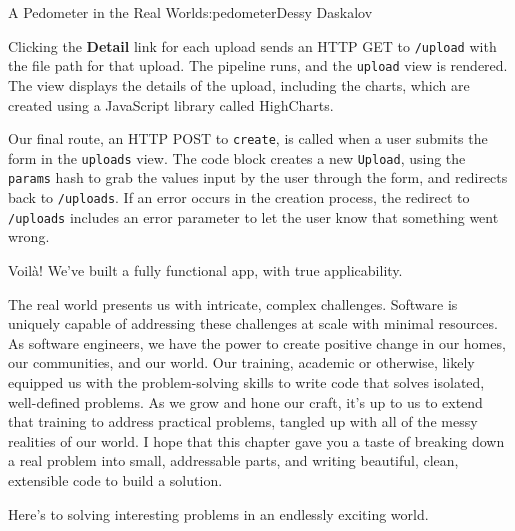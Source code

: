 \begin{aosachapter}{A Pedometer in the Real World}{s:pedometer}{Dessy Daskalov}
\label{get-upload}

Clicking the \textbf{Detail} link for each upload sends an HTTP GET to
\texttt{/upload} with the file path for that upload. The pipeline runs,
and the \texttt{upload} view is rendered. The view displays the details
of the upload, including the charts, which are created using a
JavaScript library called HighCharts.

\label{post-create}

Our final route, an HTTP POST to \texttt{create}, is called when a user
submits the form in the \texttt{uploads} view. The code block creates a
new \texttt{Upload}, using the \texttt{params} hash to grab the values
input by the user through the form, and redirects back to
\texttt{/uploads}. If an error occurs in the creation process, the
redirect to \texttt{/uploads} includes an error parameter to let the
user know that something went wrong.

\label{a-fully-functional-app}

Voilà! We've built a fully functional app, with true applicability.

The real world presents us with intricate, complex challenges. Software
is uniquely capable of addressing these challenges at scale with minimal
resources. As software engineers, we have the power to create positive
change in our homes, our communities, and our world. Our training,
academic or otherwise, likely equipped us with the problem-solving
skills to write code that solves isolated, well-defined problems. As we
grow and hone our craft, it's up to us to extend that training to
address practical problems, tangled up with all of the messy realities
of our world. I hope that this chapter gave you a taste of breaking down
a real problem into small, addressable parts, and writing beautiful,
clean, extensible code to build a solution.

Here's to solving interesting problems in an endlessly exciting world.

\end{aosachapter}
